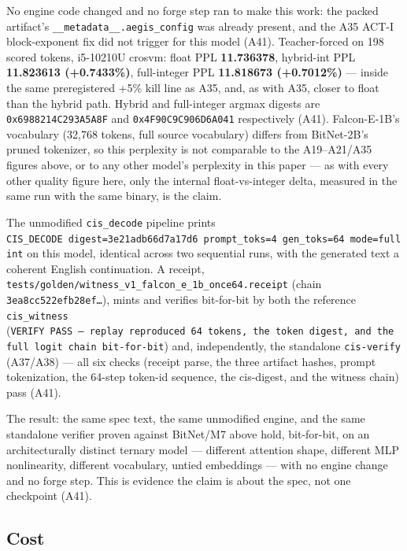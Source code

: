\documentclass[11pt]{article}
\begin{document}
No engine code changed and no forge step ran to make this work: the packed artifact's
\texttt{\_\_metadata\_\_.aegis\_config} was already present, and the A35 ACT-I block-exponent fix did not
trigger for this model (A41). Teacher-forced on 198 scored tokens, i5-10210U crosvm: float PPL
\textbf{11.736378}, hybrid-int PPL \textbf{11.823613 (+0.7433\%)}, full-integer PPL \textbf{11.818673 (+0.7012\%)}
--- inside the same preregistered +5\% kill line as A35, and, as with A35, closer to float than the
hybrid path. Hybrid and full-integer argmax digests are \texttt{0x6988214C293A5A8F} and
\texttt{0x4F90C9C906D6A041} respectively (A41). Falcon-E-1B's vocabulary (32,768 tokens, full source
vocabulary) differs from BitNet-2B's pruned tokenizer, so this perplexity is not comparable to the
A19--A21/A35 figures above, or to any other model's perplexity in this paper --- as with every other
quality figure here, only the internal float-vs-integer delta, measured in the same run with the
same binary, is the claim.

The unmodified \texttt{cis\_decode} pipeline prints \texttt{CIS\_DECODE\ digest=3e21adb66d7a17d6\ prompt\_toks=4\ gen\_toks=64\ mode=fullint} on this model, identical across two sequential runs, with the generated
text a coherent English continuation. A receipt, \texttt{tests/golden/witness\_v1\_falcon\_e\_1b\_once64.receipt}
(chain \texttt{3ea8cc522efb28ef…}), mints and verifies bit-for-bit by both the reference \texttt{cis\_witness}
(\texttt{VERIFY\ PASS\ —\ replay\ reproduced\ 64\ tokens,\ the\ token\ digest,\ and\ the\ full\ logit\ chain\ bit-for-bit}) and, independently, the standalone \texttt{cis-verify} (A37/A38) --- all six checks (receipt
parse, the three artifact hashes, prompt tokenization, the 64-step token-id sequence, the
cis-digest, and the witness chain) pass (A41).

The result: the same spec text, the same unmodified engine, and the same standalone verifier
proven against BitNet/M7 above hold, bit-for-bit, on an architecturally distinct ternary model ---
different attention shape, different MLP nonlinearity, different vocabulary, untied embeddings ---
with no engine change and no forge step. This is evidence the claim is about the spec, not one
checkpoint (A41).

\subsection{Cost}\label{cost}
\end{document}
